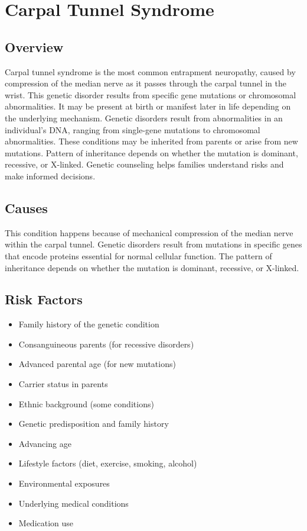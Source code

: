 \chapter{Carpal Tunnel Syndrome}
\label{sec:Carpal Tunnel Syndrome}

\section{Overview}
Carpal tunnel syndrome is the most common entrapment neuropathy, caused by compression of the median nerve as it passes through the carpal tunnel in the wrist. This genetic disorder results from specific gene mutations or chromosomal abnormalities. It may be present at birth or manifest later in life depending on the underlying mechanism. Genetic disorders result from abnormalities in an individual's DNA, ranging from single-gene mutations to chromosomal abnormalities. These conditions may be inherited from parents or arise from new mutations. Pattern of inheritance depends on whether the mutation is dominant, recessive, or X-linked. Genetic counseling helps families understand risks and make informed decisions.
\section{Causes}
This condition happens because of mechanical compression of the median nerve within the carpal tunnel. Genetic disorders result from mutations in specific genes that encode proteins essential for normal cellular function. The pattern of inheritance depends on whether the mutation is dominant, recessive, or X-linked.   
\section{Risk Factors}

\begin{itemize}[noitemsep]
  \item Family history of the genetic condition
  \item Consanguineous parents (for recessive disorders)
  \item Advanced parental age (for new mutations)
  \item Carrier status in parents
  \item Ethnic background (some conditions)
  \item Genetic predisposition and family history
  \item Advancing age
  \item Lifestyle factors (diet, exercise, smoking, alcohol)
  \item Environmental exposures
  \item Underlying medical conditions
  \item Medication use
\end{itemize}
